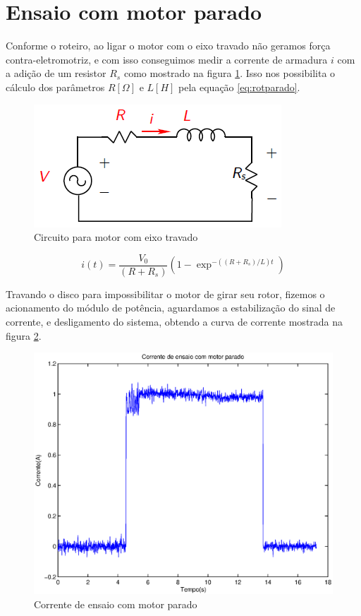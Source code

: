 \documentclass{article}
\begin{document}
\section{Ensaio com motor parado}
Conforme o roteiro\cite{bb:roteiro}, ao ligar o motor com o eixo travado não geramos força contra-eletromotriz, e com isso conseguimos medir a corrente de armadura $i$ com a adição de um resistor $R_s$ como mostrado na figura \ref{fig:rotparado}. Isso nos possibilita o cálculo dos parâmetros $R [\Omega]$ e $L [H]$ pela equação \ref{eq:rotparado}.

\begin{figure}[H]
	\centering
	\includegraphics[width=0.8\linewidth]{rotparado}
	\caption{Circuito para motor com eixo travado}
	\label{fig:rotparado}
\end{figure}

\begin{equation}
\label{eq:rotparado}
i(t) = \frac{V_0}{(R+R_s)}(1-\exp^{-((R+R_s)/L)t})
\end{equation}

Travando o disco para impossibilitar o motor de girar seu rotor, fizemos o acionamento do módulo de potência, aguardamos a estabilização do sinal de corrente, e desligamento do sistema, obtendo a curva de corrente mostrada na figura \ref{fig:ensaiop}.

\begin{figure}[H]
	\centering
	\includegraphics[width=0.8\linewidth]{../ensaiop}
	\caption{Corrente de ensaio com motor parado}
	\label{fig:ensaiop}
\end{figure}
\end{document}
